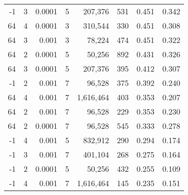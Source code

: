 \begin{table}[H]
\begin{tabular}{rrrrrrrr}
-1 & 3 & 0.0001 & 5 & 207,376 & 531 & 0.451 & 0.342 \\
64 & 4 & 0.0001 & 3 & 310,544 & 330 & 0.451 & 0.308 \\
64 & 3 & 0.001 & 3 & 78,224 & 474 & 0.451 & 0.322 \\
64 & 2 & 0.0001 & 5 & 50,256 & 892 & 0.431 & 0.326 \\
64 & 3 & 0.0001 & 5 & 207,376 & 395 & 0.412 & 0.307 \\
-1 & 2 & 0.001 & 7 & 96,528 & 375 & 0.392 & 0.240 \\
64 & 4 & 0.001 & 7 & 1,616,464 & 403 & 0.353 & 0.207 \\
64 & 2 & 0.001 & 7 & 96,528 & 229 & 0.353 & 0.230 \\
64 & 2 & 0.0001 & 7 & 96,528 & 545 & 0.333 & 0.278 \\
-1 & 4 & 0.001 & 5 & 832,912 & 290 & 0.294 & 0.174 \\
-1 & 3 & 0.001 & 7 & 401,104 & 268 & 0.275 & 0.164 \\
-1 & 2 & 0.0001 & 5 & 50,256 & 432 & 0.255 & 0.109 \\
-1 & 4 & 0.001 & 7 & 1,616,464 & 145 & 0.235 & 0.151 \\
\bottomrule
\end{tabular}

\normalsize
\end{table}
